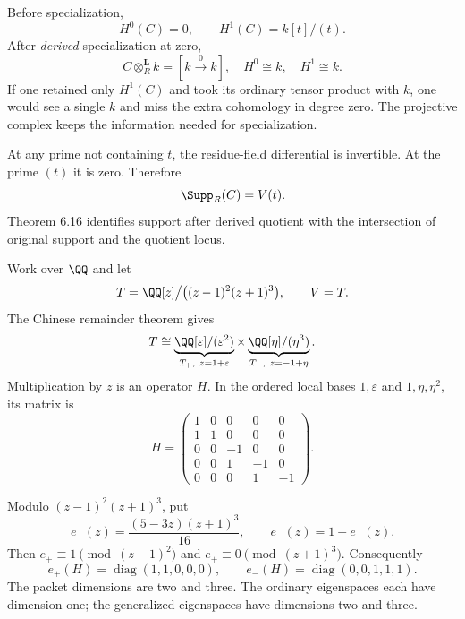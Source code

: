 Before specialization,
\[
H^0(C)=0,\qquad H^1(C)=k[t]/(t).
\]
After \emph{derived} specialization at zero,
\[
C\otimes_R^{\mathbf L}k=[k\xrightarrow{0}k],
\quad H^0\cong k,\quad H^1\cong k.
\]
If one retained only $H^1(C)$ and took its ordinary tensor product with $k$, one would see a single $k$ and miss the extra cohomology in degree zero. The projective complex keeps the information needed for specialization.

At any prime not containing $t$, the residue-field differential is invertible. At the prime $(t)$ it is zero. Therefore
\[
\Supp_R(C)=V(t).
\]
Theorem 6.16 identifies support after derived quotient with the intersection of original support and the quotient locus.


Work over $\QQ$ and let
\[
T=\QQ[z]\big/\bigl((z-1)^2(z+1)^3\bigr),\qquad V=T.
\]
The Chinese remainder theorem gives
\[
T\cong \underbrace{\QQ[\varepsilon]/(\varepsilon^2)}_{T_+,\ z=1+\varepsilon}
\times
\underbrace{\QQ[\eta]/(\eta^3)}_{T_-,\ z=-1+\eta}.
\]
Multiplication by $z$ is an operator $H$. In the ordered local bases $1,\varepsilon$ and $1,\eta,\eta^2$, its matrix is
\[
H=\left(\begin{array}{cc|ccc}
1&0&0&0&0\\1&1&0&0&0\\\hline
0&0&-1&0&0\\0&0&1&-1&0\\0&0&0&1&-1
\end{array}\right).
\]


Modulo $(z-1)^2(z+1)^3$, put
\[
e_+(z)=\frac{(5-3z)(z+1)^3}{16},\qquad e_-(z)=1-e_+(z).
\]
Then $e_+\equiv1\pmod{(z-1)^2}$ and $e_+\equiv0\pmod{(z+1)^3}$. Consequently
\[
e_+(H)=\operatorname{diag}(1,1,0,0,0),\qquad
 e_-(H)=\operatorname{diag}(0,0,1,1,1).
\]
The packet dimensions are two and three. The ordinary eigenspaces each have dimension one; the generalized eigenspaces have dimensions two and three.

